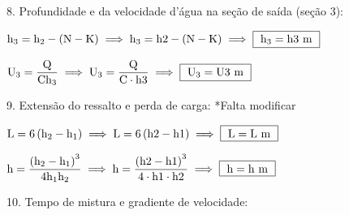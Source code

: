 \documentclass{article}
\newcommand{\myspace}{0.5cm}
\begin{document}
\vspace{\myspace}

8. Profundidade e da velocidade d'água na seção de saída (seção 3):

\vspace{\myspace}

\begin{center}
	$
		\mathrm
		{
			h_{3} = h_{2} - \left ( N - K \right )
		} 
		\implies
		\mathrm
		{
			h_{3} = {{h2}} - \left ( {{N}} - {{K}} \right )
		}
		\implies 
		\fbox
		{
			$\mathrm
			{	
				h_{3} = {{h3}} \ m
			}$
		}
	$  
\end{center}

\vspace{\myspace}

\begin{center}
	$
		\mathrm
		{
			U_{3} = \dfrac{Q}{Ch_{3}}
		} 
		\implies
		\mathrm
		{
			U_{3} = \dfrac{ {{Q}} }{ {{C}} \cdot {{h3}} }
		}
		\implies 
		\fbox
		{	
			$\mathrm
			{
				U_{3} = {{U3}} \ m
			}$
		}
	$ 
\end{center}

\vspace{\myspace}

9. Extensão do ressalto e perda de carga: *Falta modificar 

\vspace{\myspace}

\begin{center}
	$
		\mathrm
		{
			L = 6\left ( h_{2} - h_{1} \right)
		} 
		\implies
		\mathrm
		{
			L = 6\left ( {{h2}} - {{h1}} \right)
		}
		\implies 
		\fbox
		{ 
			$\mathrm
			{
				L = {{L}} \ m
			}$
		}
	$
\end{center}

\vspace{\myspace}

\begin{center}
	$
		\mathrm
		{
			h = \dfrac{\left ( h_{2} - h_{1} \right)^{3}}{4h_{1}h_{2}} 
		} 
		\implies
		\mathrm
		{
			h = \dfrac{\left ( {{h2}} - {{h1}} \right)^{3} }{4\cdot {{h1}} \cdot {{h2}} } 
		}
		\implies 
		\fbox
		{
			$\mathrm
			{
				h = {{h}} \ m
			}$
		}
	$
\end{center}

\vspace{\myspace}

10. Tempo de mistura e gradiente de velocidade:
\end{document}
